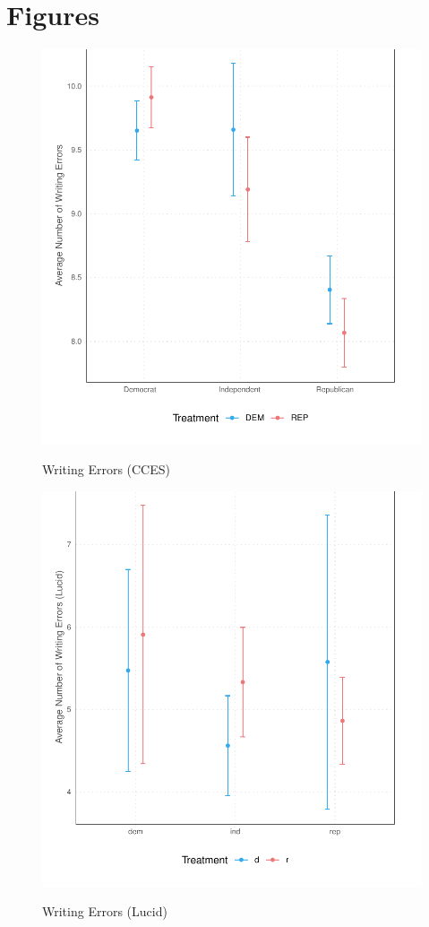 \documentclass[12pt, letterpaper]{article}
\begin{document}
\clearpage

\section{Figures}

\begin{figure}[!htbp]
\centering
\caption{Writing Errors (CCES)}
\includegraphics[]{../figs/text_cces.pdf}
\label{fig:text_cces}
\end{figure}
\clearpage
\begin{figure}[!htbp]
\centering
\caption{Writing Errors (Lucid)}
\includegraphics[]{../figs/text_lucid.pdf}
\label{fig:text_lucid}
\end{figure}
\end{document}
